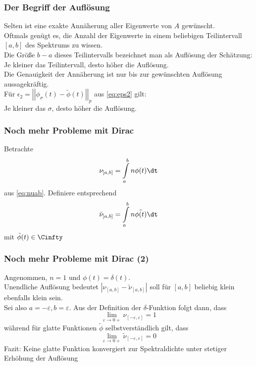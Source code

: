 \begin{frame}
    \frametitle{Der Begriff der Auflösung}
    Selten ist eine exakte Annäherung aller Eigenwerte von $A$ gewünscht.\\
    Oftmals genügt es, die Anzahl der Eigenwerte in einem beliebigen Teilintervall $[a, b]$ des Spektrums zu wissen.\\
    Die Größe $b - a$ dieses Teilintervalls bezeichnet man als Auflösung der Schätzung:\\
    Je kleiner das Teilintervall, desto höher die Auflösung.\\
    Die Genauigkeit der Annäherung ist nur bis zur gewünschten Auflösung aussagekräftig.\\
    Für $\epsilon_2 = \left|\left| \phi_{\sigma}(t) - \tilde{\phi}(t) \right|\right|_p$ aus \eqref{eq:eps2} gilt:\\
    Je kleiner das $\sigma$, desto höher die Auflösung.
\end{frame}

\begin{frame}
    \frametitle{Noch mehr Probleme mit Dirac}
    Betrachte
    $$\nu_{[a, b]} = \int\limits_a^b n \phi(t) \dt$$
    aus \eqref{eq:nuab}. Definiere entsprechend
    $$\tilde{\nu}_{[a, b]} = \int\limits_a^b n \tilde{\phi(t)} \dt$$
    mit $\tilde{\phi}(t) \in \Cinfty$
\end{frame}

\begin{frame}
    \frametitle{Noch mehr Probleme mit Dirac (2)}
    Angenommen, $n = 1$ und $\phi(t) = \delta(t)$.\\
    Unendliche Auflösung bedeutet $\left| \nu_{[a, b]} - \tilde{\nu}_{[a, b]} \right|$ soll für $[a ,b]$ beliebig klein ebenfalls klein sein.\\
    Sei also $a = -\varepsilon, b = \varepsilon$. Aus der Definition der $\delta$-Funktion folgt dann, dass
    $$\lim \limits_{\varepsilon \to 0+} \nu_{[-\varepsilon, \varepsilon]} = 1$$
    während für glatte Funktionen $\tilde{\phi}$ selbstverständlich gilt, dass
    $$\lim \limits_{\varepsilon \to 0+} \tilde{\nu}_{[-\varepsilon, \varepsilon]} = 0$$
    Fazit: Keine glatte Funktion konvergiert zur Spektraldichte unter stetiger Erhöhung der Auflösung
\end{frame}

